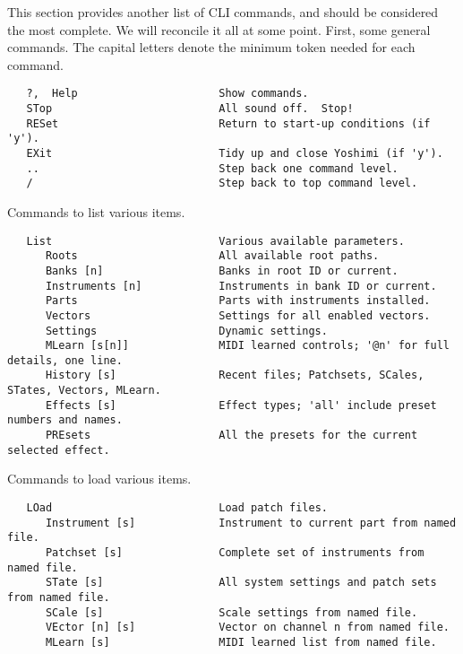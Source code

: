    This section provides another list of CLI commands, and should be considered
   the most complete.  We will reconcile it all at some point.
   First, some general commands.  The capital letters denote the minimum token
   needed for each command.

\fi

\iffalse
\begin{verbatim}
   ?,  Help                      Show commands.
   STop                          All sound off.  Stop!
   RESet                         Return to start-up conditions (if 'y').
   EXit                          Tidy up and close Yoshimi (if 'y').
   ..                            Step back one command level.
   /                             Step back to top command level.
\end{verbatim}

   Commands to list various items.

\begin{verbatim}
   List                          Various available parameters.
      Roots                      All available root paths.
      Banks [n]                  Banks in root ID or current.
      Instruments [n]            Instruments in bank ID or current.
      Parts                      Parts with instruments installed.
      Vectors                    Settings for all enabled vectors.
      Settings                   Dynamic settings.
      MLearn [s[n]]              MIDI learned controls; '@n' for full details, one line.
      History [s]                Recent files; Patchsets, SCales, STates, Vectors, MLearn.
      Effects [s]                Effect types; 'all' include preset numbers and names.
      PREsets                    All the presets for the current selected effect.
\end{verbatim}

   Commands to load various items.

\begin{verbatim}
   LOad                          Load patch files.
      Instrument [s]             Instrument to current part from named file.
      Patchset [s]               Complete set of instruments from named file.
      STate [s]                  All system settings and patch sets from named file.
      SCale [s]                  Scale settings from named file.
      VEctor [n] [s]             Vector on channel n from named file.
      MLearn [s]                 MIDI learned list from named file.
\end{verbatim}

